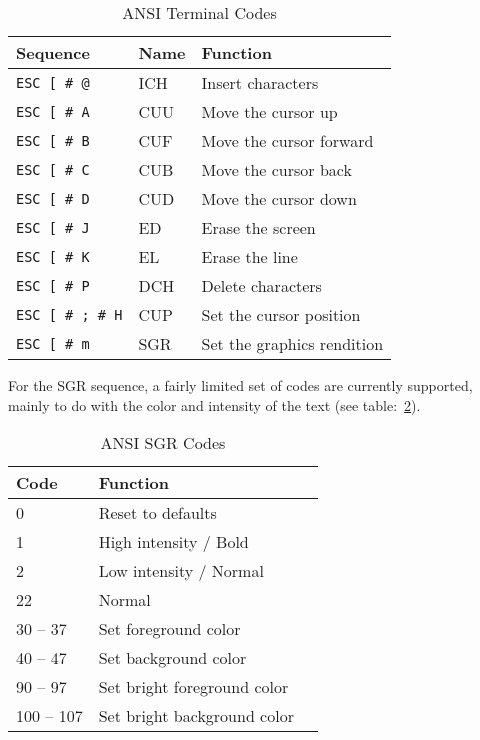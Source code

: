 \begin{table}
	\begin{center}
		\begin{tabular}{|l|l|l|} \hline
		Sequence & Name & Function \\ \hline\hline
		\verb+ESC [ # @+ & ICH & Insert characters \\ \hline
		\verb+ESC [ # A+ & CUU & Move the cursor up \\ \hline
		\verb+ESC [ # B+ & CUF & Move the cursor forward \\ \hline
		\verb+ESC [ # C+ & CUB & Move the cursor back \\ \hline
		\verb+ESC [ # D+ & CUD & Move the cursor down \\ \hline
		\verb+ESC [ # J+ & ED & Erase the screen \\ \hline
		\verb+ESC [ # K+ & EL & Erase the line \\ \hline
		\verb+ESC [ # P+ & DCH & Delete characters \\ \hline
		\verb+ESC [ # ; # H+ & CUP & Set the cursor position \\ \hline
		\verb+ESC [ # m+ & SGR & Set the graphics rendition \\ \hline
		\end{tabular}
	\end{center}
    \caption{ANSI Terminal Codes}
    \label{tbl:ansi_terminal_codes}
\end{table}

For the SGR sequence, a fairly limited set of codes are currently supported, mainly to do with the color and intensity of the text (see table:~\ref{tbl:ansi_sgr_codes}).
\begin{table}
	\begin{center}
		\begin{tabular}{|l|l|l|} \hline
		Code & Function \\ \hline\hline
		0 & Reset to defaults \\ \hline
		1 & High intensity / Bold \\ \hline
		2 & Low intensity / Normal \\ \hline
		22 & Normal \\ \hline
		30 -- 37 & Set foreground color \\ \hline
		40 -- 47 & Set background color \\ \hline
		90 -- 97 & Set bright foreground color \\ \hline
		100 -- 107 & Set bright background color \\ \hline
		\end{tabular}
	\end{center}
    \caption{ANSI SGR Codes}
    \label{tbl:ansi_sgr_codes}
\end{table}

